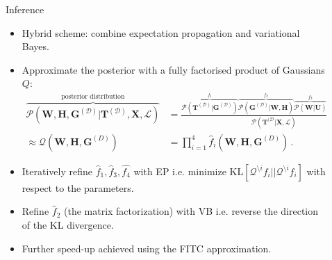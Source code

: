 \documentclass[final]{beamer}
\newlength{\sepwid}
\newlength{\onecolwid}
\newcommand{\List}{\mathcal{L}}
\begin{document}
\begin{frame}[t]
\begin{columns}[t]
\begin{column}{\onecolwid}
    \begin{block}{Inference}
       \begin{itemize}
         \item Hybrid scheme: combine expectation propagation and variational Bayes.
         \item Approximate the posterior with a fully factorised product of Gaussians $Q$:
           \begin{align*}
            \overbrace{\mathcal{P}(\mathbf{W},\mathbf{H},\mathbf{G}^{(\mathcal{D})}
            |\mathbf{T}^{(\mathcal{D})},\mathbf{X},\List)}^{\text{posterior distribution}}
            &=
            \frac{\overbrace{\mathcal{P}(\mathbf{T}^{(\mathcal{D})}|\mathbf{G}^{(\mathcal{D})})}^{f_1}
            \overbrace{\mathcal{P}(\mathbf{G}^{(\mathcal{D})}|\mathbf{W},\mathbf{H})}^{f_2}
            \overbrace{\mathcal{P}(\mathbf{W}|\mathbf{U})}^{f_3}
            \overbrace{\mathcal{P}(\mathbf{H}|\mathbf{X},\List)}^{f_4}}
            {\mathcal{P}(\mathbf{T}^{(\mathcal{D}}|\mathbf{X},\List)}\,.\\
            \approx \mathcal{Q}(\mathbf{W},\mathbf{H},\mathbf{G}^{(D)}) &=
            \prod_{i=1}^4 \hat{f}_i(\mathbf{W}, \mathbf{H}, \mathbf{G}^{(D)})\,.
          \end{align*}
          \item Iteratively refine $\hat{f}_1,\hat{f}_3,\hat{f_4}$ with EP i.e. minimize
            $\mathrm{KL}[\mathcal{Q}^{\setminus i}f_i||\mathcal{Q}^{\setminus i}\hat{f}_i]$ with respect
            to the parameters.
          \item Refine $\hat{f}_2$ (the matrix factorization) with VB i.e. reverse the direction of
            the KL divergence.
          \item Further speed-up achieved using the FITC approximation.
        \end{itemize}
      \end{block}

    \end{column}

      \begin{column}{\sepwid}\end{column}   %

      \begin{column}{\onecolwid}


\end{column}
\end{columns}
\end{frame}
\end{document}
